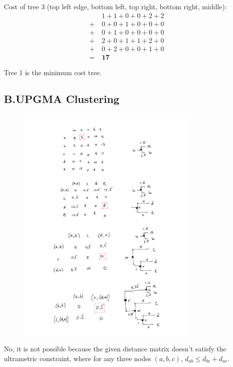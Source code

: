 \documentclass{article}[11pt]
\begin{document}
Cost of tree 3 (top left edge, bottom left, top right, bottom right, middle):
\begin{align*}
          &  1 + 1 + 0 + 0 + 2 + 2 \\
   + \ &  0 + 0 + 1 + 0 + 0 + 0 \\
   + \ &  0 + 1 + 0 + 0 + 0 + 0 \\
   + \ &  2 + 0 + 1 + 1 + 2 + 0 \\
   + \ &  0 + 2 + 0 + 0 + 1 + 0 \\
   = \ & \mathbf{17}
\end{align*}

Tree 1 is the minimum cost tree.

\subsection*{B.\quad UPGMA Clustering}
\begin{figure}[H]
    \includegraphics[width=0.8\textwidth]{problem2/b.png}
\end{figure}
    
No, it is not possible because the given distance matrix doesn't
satisfy the ultrametric constraint, where for any
three nodes $(a, b, c)$, $d_{ab} \le d_{bc} + d_{ac}$.
\end{document}
